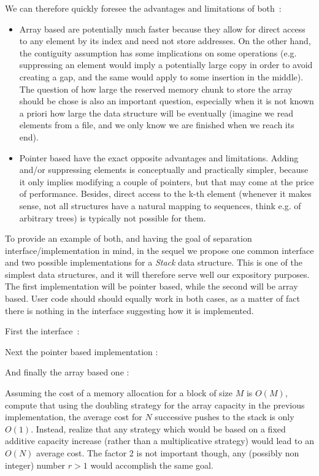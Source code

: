 \documentclass[12pt]{article}
\theoremstyle{plain}
\theoremstyle{remark}
\begin{document}
\medskip
\noindent
We can therefore quickly foresee the advantages and limitations of both~: 
\begin{itemize}
	\item Array based are potentially much faster because they allow for
		direct access to any element by its index and need not store 
		addresses. On the other hand,
		the contiguity assumption has some implications on some
		operations (e.g. suppressing an element would imply a
		potentially large copy in order to avoid creating a gap, and the
		same would apply to some insertion in the middle). The
		question of how large the reserved memory chunk to store the
		array should be chose is also an important question, especially
		when it is not known a priori how large the data structure will
		be eventually (imagine we read elements from a file, and we only
		know we are finished when we reach its end).
	\item Pointer based have the exact opposite advantages and limitations. 
		Adding and/or suppressing elements is conceptually and
		practically simpler, because it only implies modifying a
		couple of pointers, but that may come at the price of
		performance. Besides, direct access to the k-th element 
		(whenever it makes sense, not all structures have a natural
		mapping to sequences, think e.g. of arbitrary trees) 
		is typically not possible for them.
\end{itemize}

To provide an example of both, and having the goal of separation 
interface/implementation in mind, in the sequel we propose one common 
interface and two possible implementations for a {\it Stack} data structure.
This is one of the simplest data structures, and it will therefore serve well
our expository purposes. The first implementation will be pointer based, while 
the second will be array based. 
User code should should equally work in both cases, as a matter of fact there
is nothing in the interface suggesting how it is implemented.

\medskip
\noindent
First the interface~:


\noindent
Next the pointer based implementation :


\noindent
And finally the array based one :


 Assuming the cost of a memory allocation for a block
of size $M$ is $O(M)$, compute that using the doubling strategy for the array
capacity in the previous implementation, the average cost for $N$ successive
pushes to the stack is only $O(1)$. Instead, realize that any strategy which
would be based on a fixed additive capacity increase (rather than a 
multiplicative strategy) would lead to an $O(N)$ average cost. The factor 2 is
not important though, any (possibly non integer) number $r>1$ would accomplish
the same goal.  
\end{document}
